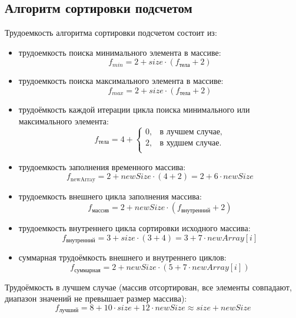 \subsection{Алгоритм сортировки подсчетом}
Трудоемкость алгоритма сортировки подсчетом состоит из:
\begin{itemize}
	\item трудоемкость поиска минимального элемента в массиве:
	\begin{equation}
		\label{min}
		f_{min} =  2 + size \cdot (f_{\text{тела}} + 2)
	\end{equation}

	\item трудоемкость поиска максимального элемента в массиве:
	\begin{equation}
		\label{max}
		f_{max} =  2 + size \cdot (f_{\text{тела}} + 2)
	\end{equation}
			
	\item трудоёмкость каждой итерации цикла поиска минимального или максимального элемента:
	\begin{equation}
	\label{min_max_if}
	f_{\text{тела}} = 4 + \begin{cases}
		0, & \text{в лучшем случае},\\
		2, & \text{в худшем случае}.\\
	\end{cases}
	\end{equation}

	\item трудоемкость заполнения временного массива:
	\begin{equation}
		\label{newArray}
		f_{\text{newArray}} = 2 + newSize \cdot (4 + 2) = 2 + 6 \cdot newSize
	\end{equation}

	\item трудоемкость внешнего цикла заполнения массива:
	\begin{equation}
		\label{array}
		f_{\text{массив}} = 2 + newSize \cdot (f_{\text{внутренний}} + 2) 
	\end{equation}

	\item трудоемкость внутреннего цикла сортировки исходного массива:
	\begin{equation}
		\label{innerArray}
		f_{\text{внутренний}} = 3 + size \cdot (3 + 4)  = 3 + 7 \cdot  newArray[i]
	\end{equation}
	
	\item суммарная трудоёмкость внешнего и внутреннего циклов:
	\begin{equation}
		\label{array}
		f_{\text{суммарная}} = 2 + newSize \cdot (5 + 7 \cdot newArray[i]) 
	\end{equation}
\end{itemize}
\pagebreak
Трудоёмкость в лучшем случае (массив отсортирован, все элементы совпадают, диапазон значений не превышает размер массива):
\begin{equation}
	\label{best_counting}
	f_{\text{лучший}} = 8 + 10 \cdot size + 12 \cdot newSize \approx size + newSize
\end{equation}


